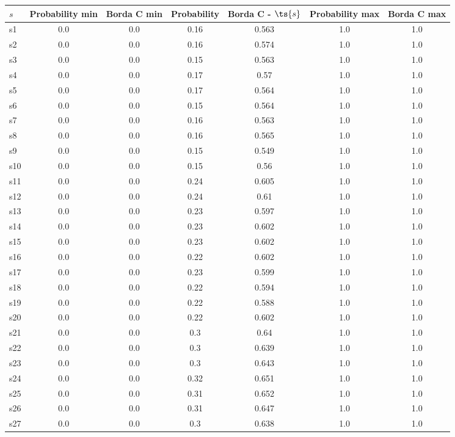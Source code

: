 \documentclass{article}
\begin{document}
\noindent\begin{tabular}{|l|c|c|c|c|c|c|}
\hline
$s$& Probability min & Borda C min & Probability & Borda C - $\ts{s}$ & Probability max & Borda C max\\
\hline
s1 &0.0 & 0.0 & 0.16 & 0.563 & 1.0 & 1.0\\
\hline
s2 &0.0 & 0.0 & 0.16 & 0.574 & 1.0 & 1.0\\
\hline
s3 &0.0 & 0.0 & 0.15 & 0.563 & 1.0 & 1.0\\
\hline
s4 &0.0 & 0.0 & 0.17 & 0.57 & 1.0 & 1.0\\
\hline
s5 &0.0 & 0.0 & 0.17 & 0.564 & 1.0 & 1.0\\
\hline
s6 &0.0 & 0.0 & 0.15 & 0.564 & 1.0 & 1.0\\
\hline
s7 &0.0 & 0.0 & 0.16 & 0.563 & 1.0 & 1.0\\
\hline
s8 &0.0 & 0.0 & 0.16 & 0.565 & 1.0 & 1.0\\
\hline
s9 &0.0 & 0.0 & 0.15 & 0.549 & 1.0 & 1.0\\
\hline
s10 &0.0 & 0.0 & 0.15 & 0.56 & 1.0 & 1.0\\
\hline
s11 &0.0 & 0.0 & 0.24 & 0.605 & 1.0 & 1.0\\
\hline
s12 &0.0 & 0.0 & 0.24 & 0.61 & 1.0 & 1.0\\
\hline
s13 &0.0 & 0.0 & 0.23 & 0.597 & 1.0 & 1.0\\
\hline
s14 &0.0 & 0.0 & 0.23 & 0.602 & 1.0 & 1.0\\
\hline
s15 &0.0 & 0.0 & 0.23 & 0.602 & 1.0 & 1.0\\
\hline
s16 &0.0 & 0.0 & 0.22 & 0.602 & 1.0 & 1.0\\
\hline
s17 &0.0 & 0.0 & 0.23 & 0.599 & 1.0 & 1.0\\
\hline
s18 &0.0 & 0.0 & 0.22 & 0.594 & 1.0 & 1.0\\
\hline
s19 &0.0 & 0.0 & 0.22 & 0.588 & 1.0 & 1.0\\
\hline
s20 &0.0 & 0.0 & 0.22 & 0.602 & 1.0 & 1.0\\
\hline
s21 &0.0 & 0.0 & 0.3 & 0.64 & 1.0 & 1.0\\
\hline
s22 &0.0 & 0.0 & 0.3 & 0.639 & 1.0 & 1.0\\
\hline
s23 &0.0 & 0.0 & 0.3 & 0.643 & 1.0 & 1.0\\
\hline
s24 &0.0 & 0.0 & 0.32 & 0.651 & 1.0 & 1.0\\
\hline
s25 &0.0 & 0.0 & 0.31 & 0.652 & 1.0 & 1.0\\
\hline
s26 &0.0 & 0.0 & 0.31 & 0.647 & 1.0 & 1.0\\
\hline
s27 &0.0 & 0.0 & 0.3 & 0.638 & 1.0 & 1.0\\

\end{tabular}
\end{document}
